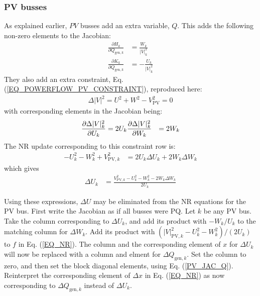 \documentclass[11pt]{article}
\newcommand{\Vr}{\ensuremath{U}}
\newcommand{\Vi}{\ensuremath{W}}
\newcommand{\Ir}{\ensuremath{H}}
\newcommand{\Ii}{\ensuremath{K}}
\begin{document}
\subsubsection{PV busses}
As explained earlier, $PV$ busses add an extra variable, $Q$. This adds the following non-zero elements to the Jacobian:
\begin{align}
\frac{\partial \Ir_k}{\partial Q_{\text{gen},k}} &= \frac{\Vi_k}{|V|_k^2} \\
\frac{\partial \Ii_k}{\partial Q_{\text{gen},k}} &= -\frac{\Vr_k}{|V|_k^2}
\end{align}
They also add an extra constraint, Eq. (\ref{EQ_POWERFLOW_PV_CONSTRAINT}), reproduced here:
\begin{align}
\Delta |V|^2 = \Vr^2 + \Vi^2 - V_\text{PV}^2 = 0
\label{EQ_POWERFLOW_PV_CONSTRAINT_AGAIN}
\end{align}
with corresponding elements in the Jacobian being:
\begin{align}
\frac{\partial \Delta|V|^2_k}{\partial \Vr_k} &= 2 \Vr_k \notag
\frac{\partial \Delta|V|^2_k}{\partial \Vi_k} &= 2 \Vi_k
\label{EQ_PV_JAC_Q}
\end{align}
The NR update corresponding to this constraint row is:
\begin{align}
	-\Vr_k^2 - \Vi_k^2 + V_{\text{PV},k}^2 &= 2\Vr_k\Delta\Vr_k + 2\Vi_k\Delta\Vi_k
\end{align}
which gives
\begin{align}
\Delta \Vr_k &= \frac{V^2_{\text{PV},k} - \Vr_k^2 - \Vi_k^2- 2\Vi_k\Delta \Vi_k}{2\Vr_k}
\end{align}

Using these expressions, $\Delta \Vr$ may be eliminated from the NR equations for the PV bus. First write the Jacobian as if all busses were PQ. Let $k$ be any PV bus. Take the column corresponding to $\Delta \Vr_k$, and add its product with $-\Vi_k/\Vr_k$ to the matching column for  $\Delta \Vi_k$. Add its product with $(|V|^2_{\text{PV},k} - \Vr_k^2 - \Vi_k^2)/(2\Vr_k)$ to $f$ in Eq. (\ref{EQ_NR}). The column and the corresponding element of $x$ for $\Delta \Vr_k$ will now be replaced with a column and elment for $\Delta Q_{\text{gen},k}$. Set the column to zero, and then set the block diagonal elements, using Eq. (\ref{PV_JAC_Q}). Reinterpret the corresponding element of $\Delta x$ in Eq. (\ref{EQ_NR}) as now corresponding to $\Delta Q_{\text{gen},k}$ instead of $\Delta \Vr_k$.
 
\end{document}
